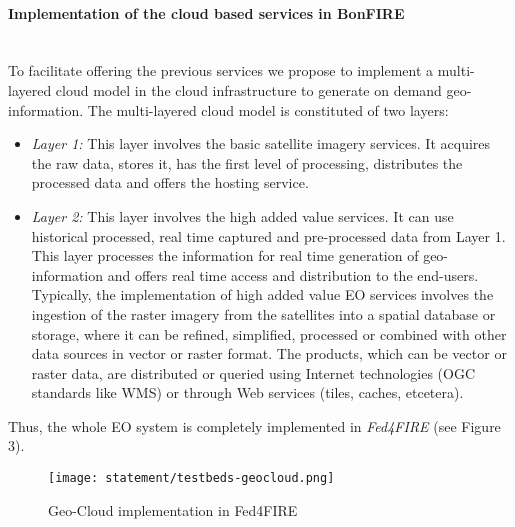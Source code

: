 \paragraph{Implementation of the cloud based services in BonFIRE}~\\
To facilitate offering the previous services we propose to implement a multi-layered cloud model in the \bonfire cloud infrastructure to generate on demand geo-information. The multi-layered cloud model is constituted of two layers:
\begin{itemize}
\item \emph{Layer 1:} This layer involves the basic satellite imagery services.  It acquires the raw data, stores it, has the first level of processing, distributes the processed data and offers the hosting service.

\item \emph{Layer 2:} This layer involves the high added value services. It can use historical processed, real time captured and pre-processed data from Layer 1. This layer processes the information for real time generation of geo-information and offers real time access and distribution to the end-users. Typically, the implementation of high added value EO services involves the ingestion of the raster imagery from the satellites into a spatial database or storage, where it can be refined, simplified, processed or combined with other data sources in vector or raster format. The products, which can be vector or raster data, are distributed or queried using Internet technologies (\ac{OGC} standards like \ac{WMS}) or through Web services (tiles, caches, etcetera).
\end{itemize}

Thus, the whole \ac{EO} system is completely implemented in \emph{Fed4FIRE} (see Figure 3).

\begin{figure}[!h]
\begin{center}
\texttt{[image: statement/testbeds-geocloud.png]}
\caption{Geo-Cloud implementation in Fed4FIRE}
\label{fig:intr-testbeds-geocloud}
\end{center}
\end{figure}




